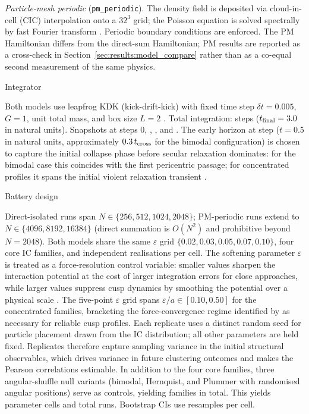 \documentclass[twocolumn,linenumbers]{aastex701}
\makeatletter
\def\subsection{\@startsection{subsection}{2}{\z@}{9pt plus 1pt minus 1pt}{4pt}%
  {\normalsize\bfseries\center}}
\newcommand{\heps}{\varepsilon}
\makeatother
\begin{document}
\textit{Particle-mesh periodic} (\texttt{pm\_periodic}).
The density field is deposited via cloud-in-cell (CIC) interpolation onto
a $32^3$ grid; the Poisson equation is solved spectrally by fast Fourier
transform \citep{HockneyEastwood1988}.
Periodic boundary conditions are enforced.
The PM Hamiltonian differs from the direct-sum Hamiltonian; PM results
are reported as a cross-check in Section~\ref{sec:results:model_compare}
rather than as a co-equal second measurement of the same physics.

\subsection{Integrator}

Both models use leapfrog KDK (kick-drift-kick) with fixed time step
$\delta t = 0.005$, $G = 1$, unit total mass, and box size $L = 2$
\citep{Quinn1997,Yoshida1990}.
Total integration: \NSteps{} steps ($t_{\rm final} = 3.0$ in natural units).
Snapshots at steps 0, \HEarly{}, \HMid{}, and \NSteps{}.
The early horizon at step \HEarly{} ($t = 0.5$ in natural units,
approximately $0.3\,t_{\rm cross}$ for the bimodal configuration) is
chosen to capture the initial collapse phase before secular relaxation
dominates: for the bimodal case this coincides with the first pericentric
passage; for concentrated profiles it spans the initial violent relaxation
transient \citep{LyndenBell1967}.

\subsection{Battery design}

Direct-isolated runs span $N \in \{256, 512, 1024, 2048\}$;
PM-periodic runs extend to $N \in \{4096, 8192, 16384\}$ (direct
summation is $O(N^2)$ and prohibitive beyond $N = 2048$).
Both models share the same $\heps$ grid
$\{0.02, 0.03, 0.05, 0.07, 0.10\}$, four core IC families, and
\NReplicates{} independent realisations per cell.
The softening parameter $\heps$ is treated as a force-resolution control
variable: smaller values sharpen the interaction potential at the cost of
larger integration errors for close approaches, while larger values
suppress cusp dynamics by smoothing the potential over a physical scale
\citep{Dehnen2001,DehnenRead2011,Athanassoula2000}.
The five-point $\heps$ grid spans $\heps/a \in [0.10, 0.50]$ for the
concentrated families, bracketing the force-convergence regime identified
by \citet{PowerEtal2003} as necessary for reliable cusp profiles.
Each replicate uses a distinct random seed for particle placement drawn
from the IC distribution; all other parameters are held fixed.
Replicates therefore capture sampling variance in the initial structural
observables, which drives variance in future clustering outcomes and
makes the Pearson correlations estimable.
In addition to the four core families, three angular-shuffle null variants
(bimodal, Hernquist, and Plummer with randomised angular positions) serve
as controls, yielding \NICs{} families in total.
This yields \NCells{} parameter cells and \TotalRuns{} total runs.
Bootstrap CIs use \NBootstrap{} resamples per cell.
\end{document}
